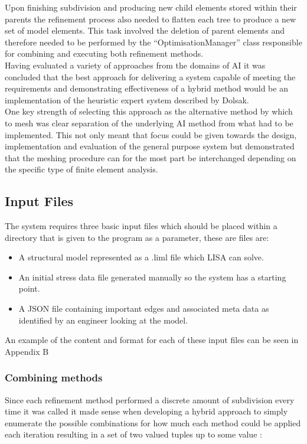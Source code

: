 \noindent
Upon finishing subdivision and producing new child elements stored within their parents the refinement process also needed to flatten each tree to produce a new set of model elements. This task involved the deletion of parent elements and therefore needed to be performed by the ``OptimisationManager'' class responsible for combining and executing both refinement methods. \\

\noindent
Having evaluated a variety of approaches from the domains of AI it was concluded that the best approach for delivering a system capable of meeting the requirements and demonstrating effectiveness of a hybrid method would be an implementation of the heuristic expert system described by Dolsak. \\ 

\noindent
One key strength of selecting this approach as the alternative method by which to mesh was clear separation of the underlying AI method from what had to be implemented. This not only meant that focus could be given towards the design, implementation and evaluation of the general purpose system but demonstrated that the meshing procedure can for the most part be interchanged depending on the specific type of finite element analysis. \\ 


\subsection{Input Files}
The system requires three basic input files which should be placed within a directory that is given to the program as a parameter, these are files are:

\begin{itemize}
\item A structural model represented as a .liml file which LISA can solve.
\item An initial stress data file generated manually so the system has a starting point.
\item A JSON file containing important edges and associated meta data as identified by an engineer looking at the model.
\end{itemize}

An example of the content and format for each of these input files can be seen in Appendix B



\subsubsection{Combining methods}
Since each refinement method performed a discrete amount of subdivision every time it was called it made sense when developing a hybrid approach to simply enumerate the possible combinations for how much each method could be applied each iteration resulting in a set of two valued tuples up to some value :

